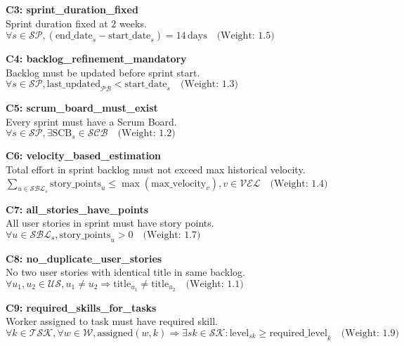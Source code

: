 \documentclass[12pt]{article}
\begin{document}
    \item \textbf{C3: sprint\_duration\_fixed} \\
    Sprint duration fixed at 2 weeks. \\
    $\forall s \in \mathcal{SP}, (\text{end\_date}_s - \text{start\_date}_s) = 14\,\text{days} \quad \text{(Weight: 1.5)}$

    \item \textbf{C4: backlog\_refinement\_mandatory} \\
    Backlog must be updated before sprint start. \\
    $\forall s \in \mathcal{SP}, \text{last\_updated}_{\mathcal{PB}} < \text{start\_date}_s \quad \text{(Weight: 1.3)}$

    \item \textbf{C5: scrum\_board\_must\_exist} \\
    Every sprint must have a Scrum Board. \\
    $\forall s \in \mathcal{SP}, \exists \text{SCB}_s \in \mathcal{SCB} \quad \text{(Weight: 1.2)}$

    \item \textbf{C6: velocity\_based\_estimation} \\
    Total effort in sprint backlog must not exceed max historical velocity. \\
    $\sum_{u \in \mathcal{SBL}_s} \text{story\_points}_u \leq \max(\text{max\_velocity}_v), v \in \mathcal{VEL} \quad \text{(Weight: 1.4)}$

    \item \textbf{C7: all\_stories\_have\_points} \\
    All user stories in sprint must have story points. \\
    $\forall u \in \mathcal{SBL}_s, \text{story\_points}_u > 0 \quad \text{(Weight: 1.7)}$

    \item \textbf{C8: no\_duplicate\_user\_stories} \\
    No two user stories with identical title in same backlog. \\
    $\forall u_1, u_2 \in \mathcal{US}, u_1 \neq u_2 \Rightarrow \text{title}_{u_1} \neq \text{title}_{u_2} \quad \text{(Weight: 1.1)}$

    \item \textbf{C9: required\_skills\_for\_tasks} \\
    Worker assigned to task must have required skill. \\
    $\forall k \in \mathcal{TSK}, \forall w \in \mathcal{W}, \text{assigned}(w,k) \Rightarrow \exists sk \in \mathcal{SK} : \text{level}_{sk} \geq \text{required\_level}_{k} \quad \text{(Weight: 1.9)}$
\end{document}
